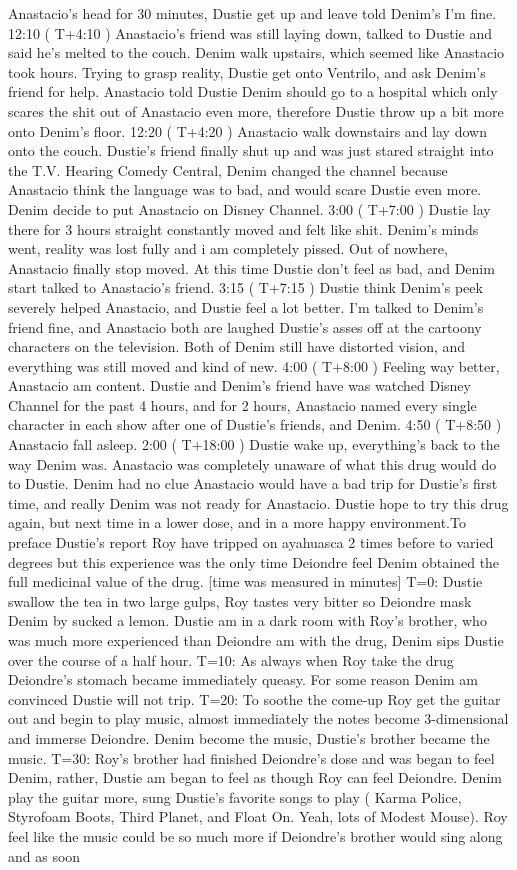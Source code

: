 \documentclass[12pt]{book}
\begin{document}
Anastacio's head for 30 minutes, Dustie get up and leave told Denim's I'm fine. 12:10 ( T+4:10 ) Anastacio's friend was still laying down, talked to Dustie and said he's melted to the couch. Denim walk upstairs, which seemed like Anastacio took hours. Trying to grasp reality, Dustie get onto Ventrilo, and ask Denim's friend for help. Anastacio told Dustie Denim should go to a hospital which only scares the shit out of Anastacio even more, therefore Dustie throw up a bit more onto Denim's floor. 12:20 ( T+4:20 ) Anastacio walk downstairs and lay down onto the couch. Dustie's friend finally shut up and was just stared straight into the T.V. Hearing Comedy Central, Denim changed the channel because Anastacio think the language was to bad, and would scare Dustie even more. Denim decide to put Anastacio on Disney Channel. 3:00 ( T+7:00 ) Dustie lay there for 3 hours straight constantly moved and felt like shit. Denim's minds went, reality was lost fully and i am completely pissed. Out of nowhere, Anastacio finally stop moved. At this time Dustie don't feel as bad, and Denim start talked to Anastacio's friend. 3:15 ( T+7:15 ) Dustie think Denim's peek severely helped Anastacio, and Dustie feel a lot better. I'm talked to Denim's friend fine, and Anastacio both are laughed Dustie's asses off at the cartoony characters on the television. Both of Denim still have distorted vision, and everything was still moved and kind of new. 4:00 ( T+8:00 ) Feeling way better, Anastacio am content. Dustie and Denim's friend have was watched Disney Channel for the past 4 hours, and for 2 hours, Anastacio named every single character in each show after one of Dustie's friends, and Denim. 4:50 ( T+8:50 ) Anastacio fall asleep. 2:00 ( T+18:00 ) Dustie wake up, everything's back to the way Denim was. Anastacio was completely unaware of what this drug would do to Dustie. Denim had no clue Anastacio would have a bad trip for Dustie's first time, and really Denim was not ready for Anastacio. Dustie hope to try this drug again, but next time in a lower dose, and in a more happy environment.To preface Dustie's report Roy have tripped on ayahuasca 2 times before to varied degrees but this experience was the only time Deiondre feel Denim obtained the full medicinal value of the drug. [time was measured in minutes] T=0: Dustie swallow the tea in two large gulps, Roy tastes very bitter so Deiondre mask Denim by sucked a lemon. Dustie am in a dark room with Roy's brother, who was much more experienced than Deiondre am with the drug, Denim sips Dustie over the course of a half hour. T=10: As always when Roy take the drug Deiondre's stomach became immediately queasy. For some reason Denim am convinced Dustie will not trip. T=20: To soothe the come-up Roy get the guitar out and begin to play music, almost immediately the notes become 3-dimensional and immerse Deiondre. Denim become the music, Dustie's brother became the music. T=30: Roy's brother had finished Deiondre's dose and was began to feel Denim, rather, Dustie am began to feel as though Roy can feel Deiondre. Denim play the guitar more, sung Dustie's favorite songs to play ( Karma Police, Styrofoam Boots, Third Planet, and Float On. Yeah, lots of Modest Mouse). Roy feel like the music could be so much more if Deiondre's brother would sing along and as soon 
\end{document}
